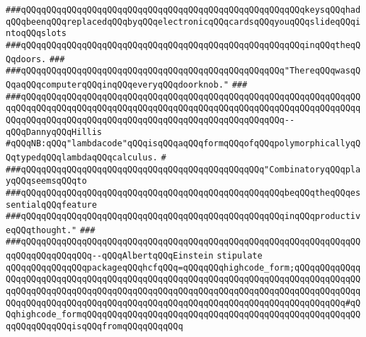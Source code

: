 \verb|###qQQqqQQqqQQqqQQqqQQqqQQqqQQqqQQqqQQqqQQqqQQqqQQqqQQqqQQqkeysqQQqhadqQQqbeenqQQqreplacedqQQqbyqQQqelectronicqQQqcardsqQQqyouqQQqslideqQQqintoqQQqslots|\newline
\verb|###qQQqqQQqqQQqqQQqqQQqqQQqqQQqqQQqqQQqqQQqqQQqqQQqqQQqqQQqinqQQqtheqQQqdoors.|\newline
\verb|###|\newline
\verb|###qQQqqQQqqQQqqQQqqQQqqQQqqQQqqQQqqQQqqQQqqQQqqQQqqQQq"ThereqQQqwasqQQqaqQQqcomputerqQQqinqQQqeveryqQQqdoorknob."|\newline
\verb|###|\newline
\verb|###qQQqqQQqqQQqqQQqqQQqqQQqqQQqqQQqqQQqqQQqqQQqqQQqqQQqqQQqqQQqqQQqqQQqqQQqqQQqqQQqqQQqqQQqqQQqqQQqqQQqqQQqqQQqqQQqqQQqqQQqqQQqqQQqqQQqqQQqqQQqqQQqqQQqqQQqqQQqqQQqqQQqqQQqqQQqqQQqqQQqqQQqqQQqqQQq--qQQqDannyqQQqHillis|\newline
\newline
\newline
\newline
\verb|#qQQqNB:qQQq"lambdacode"qQQqisqQQqaqQQqformqQQqofqQQqpolymorphicallyqQQqtypedqQQqlambdaqQQqcalculus.|\newline
\verb|#|\newline
\newline
\newline
\newline
\verb|###qQQqqQQqqQQqqQQqqQQqqQQqqQQqqQQqqQQqqQQqqQQqqQQq"CombinatoryqQQqplayqQQqseemsqQQqto|\newline
\verb|###qQQqqQQqqQQqqQQqqQQqqQQqqQQqqQQqqQQqqQQqqQQqqQQqqQQqbeqQQqtheqQQqessentialqQQqfeature|\newline
\verb|###qQQqqQQqqQQqqQQqqQQqqQQqqQQqqQQqqQQqqQQqqQQqqQQqqQQqinqQQqproductiveqQQqthought."|\newline
\verb|###|\newline
\verb|###qQQqqQQqqQQqqQQqqQQqqQQqqQQqqQQqqQQqqQQqqQQqqQQqqQQqqQQqqQQqqQQqqQQqqQQqqQQqqQQqqQQq--qQQqAlbertqQQqEinstein|\newline
\newline
\newline
\verb|stipulate|\newline
\verb|qQQqqQQqqQQqqQQqpackageqQQqhcfqQQq=qQQqqQQqhighcode_form;qQQqqQQqqQQqqQQqqQQqqQQqqQQqqQQqqQQqqQQqqQQqqQQqqQQqqQQqqQQqqQQqqQQqqQQqqQQqqQQqqQQqqQQqqQQqqQQqqQQqqQQqqQQqqQQqqQQqqQQqqQQqqQQqqQQqqQQqqQQqqQQqqQQqqQQqqQQqqQQqqQQqqQQqqQQqqQQqqQQqqQQqqQQqqQQqqQQqqQQqqQQqqQQqqQQqqQQqqQQq#qQQqhighcode_formqQQqqQQqqQQqqQQqqQQqqQQqqQQqqQQqqQQqqQQqqQQqqQQqqQQqqQQqqQQqqQQqqQQqisqQQqfromqQQqqQQqqQQq|\newline
